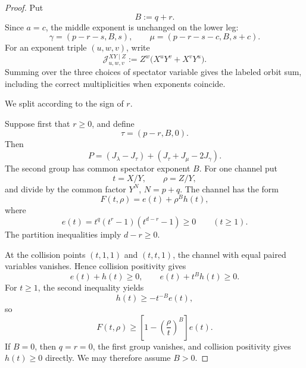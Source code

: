 \documentclass[11pt]{article}
\theoremstyle{definition}
\begin{document}
\begin{proof}
Put
\begin{equation*}
B:=q+r.
\end{equation*}
Since \(a=c\), the middle exponent is unchanged on the lower leg:
\begin{equation*}
\gamma=(p-r-s,B,s),
\qquad
\mu=(p-r-s-c,B,s+c).
\end{equation*}
For an exponent triple \((u,w,v)\), write
\begin{equation*}
\mathcal J_{u,w,v}^{XY\mid Z}
:=Z^w\bigl(X^uY^v+X^vY^u\bigr).
\end{equation*}
Summing over the three choices of spectator variable gives the labeled orbit sum, including the correct multiplicities when exponents coincide.

We split according to the sign of \(r\).

Suppose first that \(r\ge0\), and define
\begin{equation*}
\tau=(p-r,B,0).
\end{equation*}
Then
\begin{equation*}
P=(J_\lambda-J_\tau)+(J_\tau+J_\mu-2J_\gamma).
\end{equation*}
The second group has common spectator exponent \(B\).  For one channel put
\begin{equation*}
t=X/Y,
\qquad
\rho=Z/Y,
\end{equation*}
and divide by the common factor \(Y^N\), \(N=p+q\).  The channel has the form
\begin{equation}\label{eq:common-middle-positive-r-channel}
F(t,\rho)=e(t)+\rho^B h(t),
\end{equation}
where
\begin{equation}\label{eq:common-middle-positive-r-profile}
e(t)
=t^q(t^r-1)(t^{d-r}-1)\ge0
\qquad(t\ge1).
\end{equation}
The partition inequalities imply \(d-r\ge0\).

At the collision points \((t,1,1)\) and \((t,t,1)\), the channel with equal paired variables vanishes.  Hence collision positivity gives
\begin{equation*}
e(t)+h(t)\ge0,
\qquad
e(t)+t^Bh(t)\ge0.
\end{equation*}
For \(t\ge1\), the second inequality yields
\begin{equation*}
h(t)\ge-t^{-B}e(t),
\end{equation*}
so
\begin{equation}\label{eq:common-middle-positive-r-bound}
F(t,\rho)
\ge
\left[1-\left(\frac{\rho}{t}\right)^B\right]e(t).
\end{equation}
If \(B=0\), then \(q=r=0\), the first group vanishes, and collision positivity gives \(h(t)\ge0\) directly.  We may therefore assume \(B>0\).


\end{proof}
\end{document}
